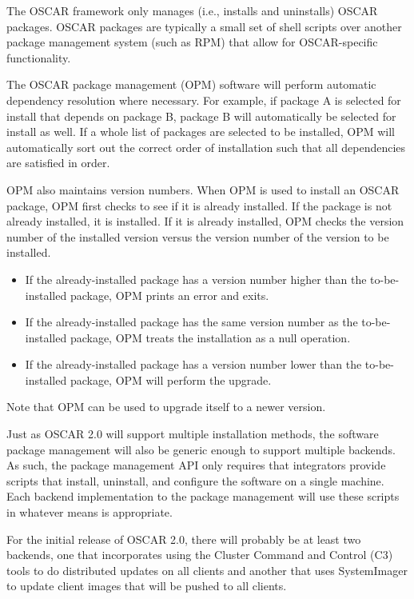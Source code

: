 The OSCAR framework only manages (i.e., installs and uninstalls) OSCAR
packages.  OSCAR packages are typically a small set of shell scripts
over another package management system (such as RPM) that allow for
OSCAR-specific functionality.

The OSCAR package management (OPM) software will perform automatic
dependency resolution where necessary.  For example, if package A is
selected for install that depends on package B, package B will
automatically be selected for install as well.  If a whole list of
packages are selected to be installed, OPM will automatically sort out
the correct order of installation such that all dependencies are
satisfied in order.

OPM also maintains version numbers.  When OPM is used to install an
OSCAR package, OPM first checks to see if it is already installed.  If
the package is not already installed, it is installed.  If it is
already installed, OPM checks the version number of the installed
version versus the version number of the version to be installed.

\begin{itemize}
\item If the already-installed package has a version number higher
  than the to-be-installed package, OPM prints an error and exits.

\item If the already-installed package has the same version number as
  the to-be-installed package, OPM treats the installation as a null
  operation. 

\item If the already-installed package has a version number lower than
  the to-be-installed package, OPM will perform the upgrade.
\end{itemize}

Note that OPM can be used to upgrade itself to a newer version.

Just as OSCAR 2.0 will support multiple installation methods, the
software package management will also be generic enough to support
multiple backends.  As such, the package management API only requires
that integrators provide scripts that install, uninstall, and
configure the software on a single machine. Each backend
implementation to the package management will use these scripts in
whatever means is appropriate.

For the initial release of OSCAR 2.0, there will probably be at least
two backends, one that incorporates using the Cluster Command and
Control (C3) tools to do distributed updates on all clients and
another that uses SystemImager to update client images that will be
pushed to all clients.

